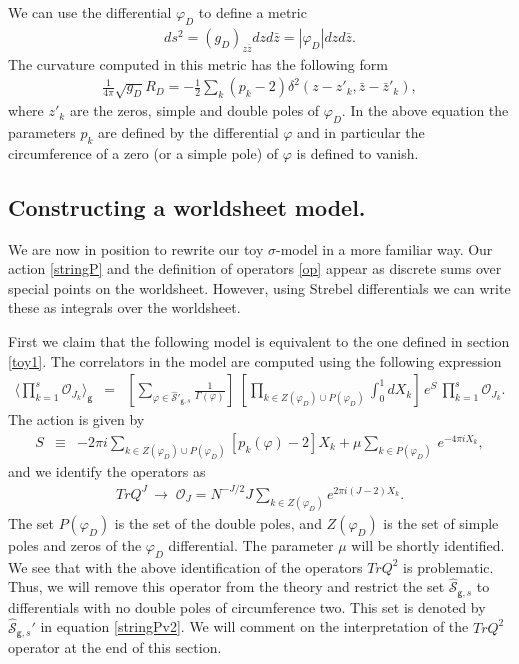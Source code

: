 \documentclass[11pt]{JHEP3}
\def\be{\begin{eqnarray}}
\def\ee{\end{eqnarray}}
\def\half{\frac{1}{2}}
\def\vf{\varphi}
\def\gg{\mathsf g }
\begin{document}
We can use the differential $\vf_D$ to define a metric 
\be
ds^2=(g_D)_{z\bar z}dzd\bar z=|\vf_D| dz d\bar z.
\ee The curvature computed in this metric has the following form
\be
\frac{1}{4\pi}\sqrt{g_D}R_D=-\half\sum_{k}(p_k-2)\delta^2(z-z'_k,\bar z-\bar z'_k),
\ee where $z'_k$ are the zeros, simple and double poles of $\vf_D$. In the above equation
the parameters $p_k$ are defined by the differential $\vf$ and in particular the circumference of a zero (or a simple pole) of $\vf$ is defined to vanish. 

\subsection{Constructing a worldsheet model.}\label{final}

We are now in position to rewrite our toy $\sigma$-model in a more familiar way.  Our action
\eqref{stringP} and the definition of operators \eqref{op} appear as discrete
sums over special points on the worldsheet. However, using Strebel differentials
we can write these as integrals over the worldsheet. 

First we claim that the following model is equivalent to the one defined in section
\ref{toy1}. The correlators in the model are computed using the following expression
\be\label{stringPv2}
\langle\prod_{k=1}^s{\mathcal O}_{J_k}\rangle_\gg&=&\left[\sum_{\vf\in\hat {\mathcal S}'_{\gg,s}}\frac{1}{\Gamma(\vf)}\right]\; 
\left[\prod_{k\in Z(\vf_D)\cup P(\vf_D)} \int_0^1dX_k\right]\,
 e^{S}\, \prod_{k=1}^s{\mathcal O}_{J_k}.
\ee The action is given by
\be\label{action}
S&\equiv& -2\pi i\sum_{k\in Z(\vf_D)\cup P(\vf_D)} \left[p_k(\vf)-2\right] X_k 
+\mu\sum_{k\in P(\vf_D)}\, e^{-4\pi i X_k},
\ee
 and we identify the operators as
\be\label{opv2}
TrQ^J\,\to\;{\mathcal O}_J=N^{-J/2}
J\sum_{k\in Z(\vf_D)} e^{2\pi i (J-2) X_k}.
\ee The set $P(\vf_D)$ is the set of the double poles, and
$Z(\vf_D)$ is the set of simple poles and zeros of the $\vf_D$ differential.
The parameter $\mu$ will be shortly identified. 
We see that with the above identification of the operators $TrQ^2$ is
problematic. Thus, we will remove this operator from the theory and restrict the set
 $\hat{\mathcal S}_{\gg,s}$ to differentials with no double poles of
circumference two. This set is denoted  by $\hat{\mathcal S}_{\gg,s}'$ in equation 
\eqref{stringPv2}. 
We will comment on the interpretation of the  $TrQ^2$ operator at
the end of this section.
\end{document}
